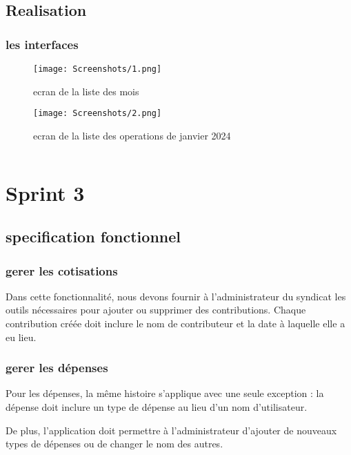 \subsection{Realisation}
\subsubsection{les interfaces}
\begin{figure}[!htbp]
  \begin{minipage}[t]{0.4\textwidth}    %
          \texttt{[image: Screenshots/1.png]}
          \caption{ ecran de la liste des mois}
  \end{minipage}%
  \begin{minipage}{0.20\textwidth}
    \hfill
  \end{minipage}
\begin{minipage}[t]{0.4\textwidth}
        \texttt{[image: Screenshots/2.png]}
        \caption{ ecran de la liste des operations de janvier 2024}
\end{minipage}%
  \end{figure}
$ $
\newpage
\section{Sprint 3}
\subsection{specification fonctionnel}
\subsubsection{gerer les cotisations}
Dans cette fonctionnalité, nous devons fournir à l'administrateur du syndicat les outils nécessaires pour ajouter ou supprimer des contributions. Chaque contribution créée doit inclure le nom de contributeur et la date à laquelle elle a eu lieu.
\subsubsection{gerer les dépenses}
Pour les dépenses, la même histoire s'applique avec une seule exception : la dépense doit inclure un type de dépense au lieu d'un nom d'utilisateur.

De plus, l'application doit permettre à l'administrateur d'ajouter de nouveaux types de dépenses ou de changer le nom des autres.

